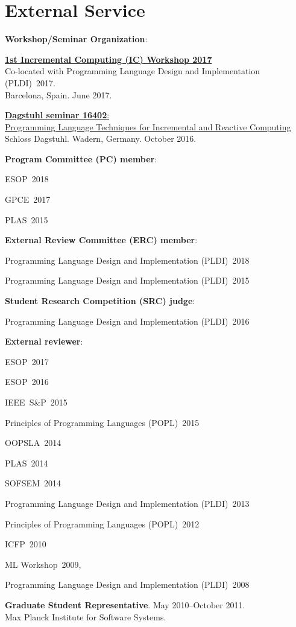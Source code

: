 \documentclass[10pt,letterpaper]{article}
\newcommand{\ReviewItem}[1]{\item #1}
\newcommand{\ReviewItemsBegin}{\begin{itemize}}
\newcommand{\ReviewItemsEnd}{\end{itemize}}
\newcommand{\POPL}[1]{Principles of Programming Languages (POPL)~#1}
\newcommand{\PLDI}[1]{Programming Language Design and Implementation (PLDI)~#1}
\newcommand{\OOPSLA}[1]{OOPSLA~#1}
\newcommand{\PLAS}[1]{PLAS~#1}
\newcommand{\SOFSEM}[1]{SOFSEM~#1}
\newcommand{\ICFP}[1]{ICFP~#1}
\newcommand{\MLWorkshop}[1]{ML Workshop~#1}
\newcommand{\IEEESP}[1]{IEEE~S\&P~#1}
\newcommand{\ESOP}[1]{ESOP~#1}
\newcommand{\GPCE}[1]{GPCE~#1}
\renewenvironment{itemize}{
  \begin{list}{}{
    \setlength{\leftmargin}{1.5em}
    \setlength{\itemsep}{0.25em}
    \setlength{\parskip}{0pt}
    \setlength{\parsep}{0.25em}
  }
}{
  \end{list}
}
\begin{document}
\section*{External Service}
\begin{itemize}

\item \textbf{Workshop/Seminar Organization}:

\ReviewItemsBegin
\ReviewItem{
{\href{https://pldi17.sigplan.org/track/ic-2017-papers}
{\textbf{1st Incremental Computing (IC) Workshop 2017}}}
\\
Co-located with \PLDI{2017}.\\
Barcelona, Spain. June 2017.
}
\ReviewItem{
{\href{http://drops.dagstuhl.de/opus/volltexte/2017/6949/}
{\textbf{Dagstuhl seminar 16402}: 
\\
Programming Language Techniques for Incremental and Reactive Computing}}
\\
Schloss Dagstuhl. Wadern, Germany. October 2016.
}
\ReviewItemsEnd
  
\item \textbf{Program Committee (PC) member}:
\ReviewItemsBegin
\ReviewItem{\ESOP{2018}}
\ReviewItem{\GPCE{2017}}
\ReviewItem{\PLAS{2015}}
\ReviewItemsEnd

\item \textbf{External Review Committee (ERC) member}: 
\ReviewItemsBegin
\ReviewItem{\PLDI{2018}}
\ReviewItem{\PLDI{2015}}
\ReviewItemsEnd

\item \textbf{Student Research Competition (SRC) judge}:
\ReviewItemsBegin
\ReviewItem{\PLDI{2016}}
\ReviewItemsEnd

\item \textbf{External reviewer}:
\ReviewItemsBegin
\ReviewItem{\ESOP{2017}}
\ReviewItem{\ESOP{2016}} 
\ReviewItem{\IEEESP{2015}}
\ReviewItem{\POPL{2015}} %
\ReviewItem{\OOPSLA{2014}} %
\ReviewItem{\PLAS{2014}} %
\ReviewItem{\SOFSEM{2014}} %
\ReviewItem{\PLDI{2013}} %
\ReviewItem{\POPL{2012}} 
\ReviewItem{\ICFP{2010}} 
\ReviewItem{\MLWorkshop{2009}},
\ReviewItem{\PLDI{2008}}
\ReviewItemsEnd

\item \textbf{Graduate Student Representative}.  
  May 2010--October 2011.
  \\
  Max Planck Institute for Software Systems.
 
\end{itemize}
\end{document}
